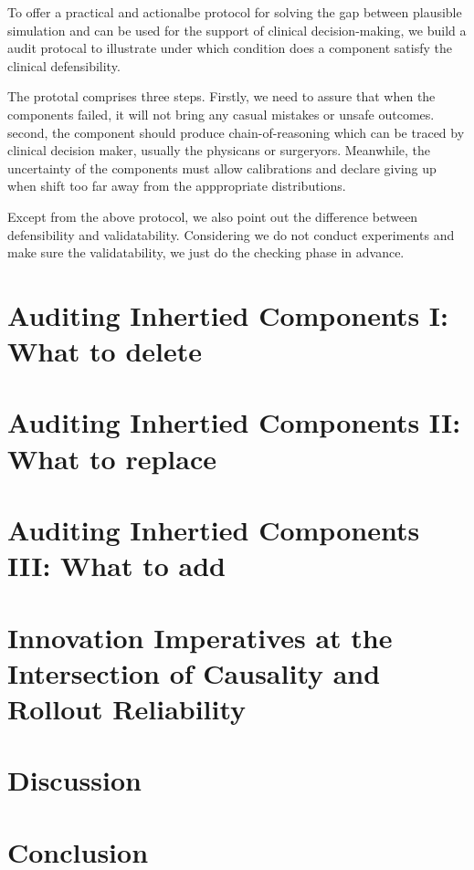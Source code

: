 \documentclass{article}
\begin{document}
To offer a practical and actionalbe protocol for solving the gap between plausible simulation and can be used for the support of clinical decision-making, we build a audit protocal to illustrate under which condition does a component satisfy the clinical defensibility.

The prototal comprises three steps. Firstly, we need to assure that when the components failed, it will not bring any casual mistakes or unsafe outcomes. second, the component should produce chain-of-reasoning which can be traced by clinical decision maker, usually the physicans or surgeryors. Meanwhile, the uncertainty of the components must allow calibrations and declare giving up when shift too far away from the apppropriate distributions.

Except from the above protocol, we also point out the difference between defensibility and validatability. Considering we do not conduct experiments and make sure the validatability, we just do the checking phase in advance.

\section{Auditing Inhertied Components I: What to delete}

\section{Auditing Inhertied Components II: What to replace}

\section{Auditing Inhertied Components III: What to add}

\section{Innovation Imperatives at the Intersection of Causality and Rollout Reliability}

\section{Discussion}

\section{Conclusion}

\printbibliography{}
\end{document}
